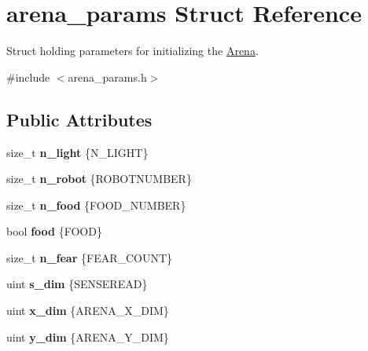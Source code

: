 \hypertarget{structarena__params}{}\section{arena\+\_\+params Struct Reference}
\label{structarena__params}


Struct holding parameters for initializing the \mbox{\hyperlink{class_arena}{Arena}}.  




{\ttfamily \#include $<$arena\+\_\+params.\+h$>$}

\subsection*{Public Attributes}
\begin{DoxyCompactItemize}
\item 
\mbox{\label{structarena__params_a168e9b69ed87816e0f3c252e026257a6}} 
size\+\_\+t {\bfseries n\+\_\+light} \{N\+\_\+\+L\+I\+G\+HT\}
\item 
\mbox{\label{structarena__params_a36b5ccdd44d1748fa06c7f0125106e26}} 
size\+\_\+t {\bfseries n\+\_\+robot} \{R\+O\+B\+O\+T\+N\+U\+M\+B\+ER\}
\item 
\mbox{\label{structarena__params_aaa626d09c852ae52c16d14e5f8b239bf}} 
size\+\_\+t {\bfseries n\+\_\+food} \{F\+O\+O\+D\+\_\+\+N\+U\+M\+B\+ER\}
\item 
\mbox{\label{structarena__params_a3f8886e6f6869c7bf9832c3553f9e1bd}} 
bool {\bfseries food} \{F\+O\+OD\}
\item 
\mbox{\label{structarena__params_a410e2d154d5138b510d1d672aa665db9}} 
size\+\_\+t {\bfseries n\+\_\+fear} \{F\+E\+A\+R\+\_\+\+C\+O\+U\+NT\}
\item 
\mbox{\label{structarena__params_a27d4f3525ec895293ad617aa8744ba5b}} 
uint {\bfseries s\+\_\+dim} \{S\+E\+N\+S\+E\+R\+E\+AD\}
\item 
\mbox{\label{structarena__params_afa86b434ed8ea5a4fe9ae14ae1438e8f}} 
uint {\bfseries x\+\_\+dim} \{A\+R\+E\+N\+A\+\_\+\+X\+\_\+\+D\+IM\}
\item 
\mbox{\label{structarena__params_ab5d50b9affa9c753c15e1d6f088824af}} 
uint {\bfseries y\+\_\+dim} \{A\+R\+E\+N\+A\+\_\+\+Y\+\_\+\+D\+IM\}
\end{DoxyCompactItemize}


